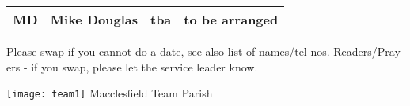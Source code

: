 \documentclass[10pt]{article}
\newif\ifpdf
\begin{document}
\begin{center}
\vspace{1em}
\begin{tabular}{|c|c|c|c|}\hline
MD & Mike Douglas & tba & to be arranged   \\
     \hline
  \end{tabular}
\end{center}
\begin{minipage}{0.7\textwidth}
Please swap if you cannot do a date, see also list of names/tel nos.
Readers/Pray-ers - if you swap, please let the service leader know.
\end{minipage}
\begin{minipage}{0.3\textwidth}
\ifpdf
\fbox{
\texttt{[image: team1]} Macclesfield Team Parish
}
\else
\hspace{2em}
\texttt{[image: team1]} Macclesfield Team Parish
\fi
\end{minipage}
\end{document}
